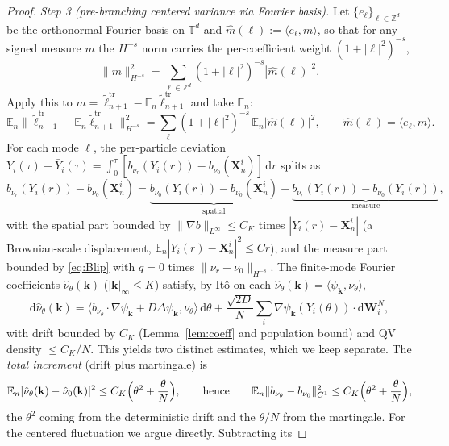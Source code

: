 \documentclass[a4paper,fleqn]{cas-sc}
\theoremstyle{definition}
\theoremstyle{remark}
\begin{document}
\begin{proof}
\emph{Step 3 (pre-branching centered variance via Fourier basis).} Let
$\{e_\ell\}_{\ell\in\mathbb Z^d}$ be the orthonormal Fourier basis on $\mathbb T^d$ and
$\hat m(\ell):=\langle e_\ell,m\rangle$, so that for any signed measure $m$ the $H^{-s}$
norm carries the per-coefficient weight $(1+|\ell|^2)^{-s}$,
\[
\|m\|_{H^{-s}}^2=\sum_{\ell\in\mathbb Z^d}(1+|\ell|^2)^{-s}|\hat m(\ell)|^2.
\]
Apply this to $m=\widetilde\ell^{\mathrm{tr}}_{n+1}-\mathbb E_n\widetilde\ell^{\mathrm{tr}}_{n+1}$
and take $\mathbb E_n$:
\[
\mathbb E_n\|\widetilde\ell^{\mathrm{tr}}_{n+1}-\mathbb E_n\widetilde\ell^{\mathrm{tr}}_{n+1}\|_{H^{-s}}^2
=\sum_{\ell}(1+|\ell|^2)^{-s}\,\mathbb E_n\bigl|\hat m(\ell)\bigr|^2,
\qquad
\hat m(\ell)=\langle e_\ell,m\rangle.
\]
For each mode $\ell$, the per-particle deviation
$Y_i(\tau)-\bar Y_i(\tau)=\int_0^\tau[b_{\nu_r}(Y_i(r))-b_{\nu_0}(\mathbf X^i_n)]\,\mathrm dr$
splits as
\begin{equation}\label{eq:disp-split}
b_{\nu_r}(Y_i(r))-b_{\nu_0}(\mathbf X^i_n)
=\underbrace{b_{\nu_0}(Y_i(r))-b_{\nu_0}(\mathbf X^i_n)}_{\text{spatial}}
+\underbrace{b_{\nu_r}(Y_i(r))-b_{\nu_0}(Y_i(r))}_{\text{measure}},
\end{equation}
with the spatial part bounded by $\|\nabla b\|_{L^\infty}\le C_K$ times
$|Y_i(r)-\mathbf X^i_n|$ (a Brownian-scale displacement,
$\mathbb E_n|Y_i(r)-\mathbf X^i_n|^2\le Cr$), and the measure part bounded by
\eqref{eq:Blip} with $q=0$ times $\|\nu_r-\nu_0\|_{H^{-s}}$. The finite-mode
Fourier coefficients $\hat\nu_\theta(\mathbf k)$ ($|\mathbf k|_\infty\le K$)
satisfy, by It\^o on each $\hat\nu_\theta(\mathbf k)=\langle\psi_{\mathbf k},\nu_\theta\rangle$,
\[
\mathrm d\hat\nu_\theta(\mathbf k)
=\langle b_{\nu_\theta}\!\cdot\!\nabla\psi_{\mathbf k}+D\Delta\psi_{\mathbf k},\nu_\theta\rangle\,\mathrm d\theta
+\frac{\sqrt{2D}}N\sum_{i}\nabla\psi_{\mathbf k}(Y_i(\theta))\!\cdot\!\mathrm d\mathbf W^N_i,
\]
with drift bounded by $C_K$ (Lemma~\ref{lem:coeff} and population bound) and QV
density $\le C_K/N$. This yields two distinct estimates, which we keep separate.
The \emph{total increment} (drift plus martingale) is
\begin{equation}\label{eq:b-fluct}
\mathbb E_n|\hat\nu_\theta(\mathbf k)-\hat\nu_0(\mathbf k)|^2\le C_K\Bigl(\theta^2+\frac\theta N\Bigr),
\qquad\text{hence}\qquad
\mathbb E_n\|b_{\nu_\theta}-b_{\nu_0}\|_{C^1}^2\le C_K\Bigl(\theta^2+\frac\theta N\Bigr),
\end{equation}
the $\theta^2$ coming from the deterministic drift and the $\theta/N$ from the
martingale. For the centered fluctuation we argue directly. Subtracting its

\end{proof}
\end{document}
